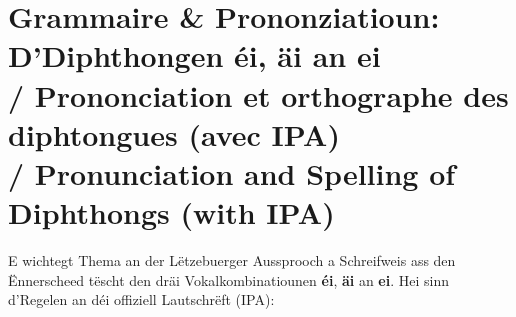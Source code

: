 \vspace{1.5em}

\section[Diphthongen éi, äi, ei / Diphthongs éi, äi, ei]{Grammaire \& Prononziatioun: D'Diphthongen éi, äi an ei \\/ Prononciation et orthographe des diphtongues (avec IPA) \\/ Pronunciation and Spelling of Diphthongs (with IPA)}

\noindent E wichtegt Thema an der Lëtzebuerger Aussprooch a Schreifweis ass den Ënnerscheed tëscht den dräi Vokalkombinatiounen \textbf{éi}, \textbf{äi} an \textbf{ei}. Hei sinn d'Regelen an déi offiziell Lautschrëft (IPA):

